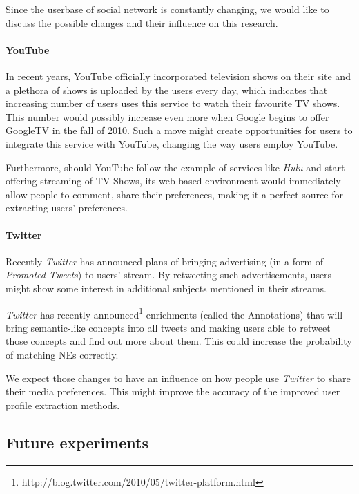 Since the userbase of social network is constantly changing, we would like to
discuss the possible changes and their influence on this research.

\paragraph{YouTube}

In recent years, YouTube officially incorporated television shows on their
site \cite{youtube-tv-shows} and a plethora of shows is uploaded by the users
every day, which indicates that increasing number of users uses this service to
watch their favourite TV shows. This number would possibly increase even more
when Google begins to offer GoogleTV in the
fall of 2010. Such a move might create opportunities for users to integrate
this service with YouTube, changing the way users employ YouTube.

Furthermore, should YouTube follow the example of services like \textit{Hulu}
and start offering streaming of TV-Shows, its web-based environment would immediately
allow people to comment, share their preferences, making it a perfect source for extracting
users' preferences.

\paragraph{Twitter}

Recently \textit{Twitter} has announced plans of bringing advertising (\eg in a form of
\textit{Promoted Tweets}) to users' stream. By retweeting such advertisements,
users might show some interest in additional subjects mentioned in their
streams.

\textit{Twitter} has recently announced\footnote{http://blog.twitter.com/2010/05/twitter-platform.html}
enrichments (called the Annotations) that will bring semantic-like concepts
into all tweets and making users able to retweet those concepts and find
out more about them. This could increase the probability of matching NEs correctly.

We expect those changes to have an influence on how people use \textit{Twitter}
to share their media preferences. This might improve the accuracy of the improved
user profile extraction methods.

\subsection{Future experiments}

